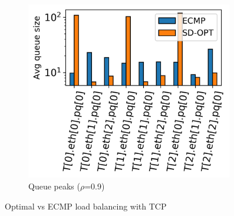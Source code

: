 \begin{figure}[!tb]
	\hfill
	\begin{subfigure}{.33\textwidth}
		\centering
		\includegraphics[width=0.99\textwidth]{Chapter4/Figures/queue_peaks_N_1}
		\caption{Queue peaks ($\rho$=0.9)}
		\label{fig:opt-vs-ecmp-queue-peaks}		
	\end{subfigure}%
	\caption{Optimal vs ECMP load balancing with TCP}
	\label{fig:opt-vs-ecmp-lb}
\end{figure}%
